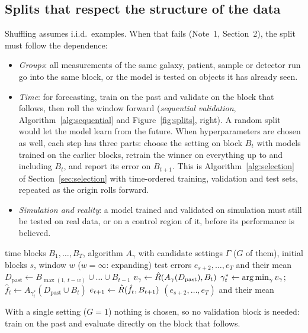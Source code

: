 \documentclass[11pt]{article}
\begin{document}
\subsection{Splits that respect the structure of the data}\label{sec:structure}

Shuffling assumes i.i.d.\ examples. When that fails (Note~1, Section~2), the split must follow the dependence:
\begin{itemize}
\item \emph{Groups}: all measurements of the same galaxy, patient, sample or detector run go into the same block, or
the model is tested on objects it has already seen.
\item \emph{Time}: for forecasting, train on the past and validate on the block that follows, then roll the window
forward (\emph{sequential validation}, Algorithm~\ref{alg:sequential} and Figure~\ref{fig:splits}, right). A random
split would let the model learn from the future. When hyperparameters are chosen as well, each step has three parts:
choose the setting on block $B_t$ with models trained on the earlier blocks, retrain the winner on everything up to
and including $B_t$, and report its error on $B_{t+1}$. This is Algorithm~\ref{alg:selection} of
Section~\ref{sec:selection} with time-ordered training, validation and test sets, repeated as the origin rolls
forward.
\item \emph{Simulation and reality}: a model trained and validated on simulation must still be tested on real data,
or on a control region of it, before its performance is believed.
\end{itemize}

\begin{algorithm}[htbp]\small
\caption{Sequential (rolling-origin) validation for time-ordered data}
\label{alg:sequential}
\begin{algorithmic}[1]
\Require time blocks $B_1, \dots, B_T$, algorithm $A_\gamma$ with candidate settings $\Gamma$ ($G$ of them), initial
blocks $s$, window $w$ ($w = \infty$: expanding)
\Ensure test errors $e_{s+2}, \dots, e_T$ and their mean
    \State $D_{\mathrm{past}} \gets B_{\max(1,\, t-w)} \cup \dots \cup B_{t-1}$ 
      \State $v_\gamma \gets \hat R(A_\gamma(D_{\mathrm{past}}), B_t)$ 
    \EndFor
    \State $\gamma_t^* \gets \operatorname*{arg\,min}_\gamma v_\gamma$; \ $\hat f_t \gets A_{\gamma_t^*}(D_{\mathrm{past}} \cup B_t)$ 
    \State $e_{t+1} \gets \hat R(\hat f_t, B_{t+1})$ 
  \EndFor
  \State \Return $(e_{s+2}, \dots, e_T)$ and their mean
\EndFunction
\end{algorithmic}
With a single setting ($G = 1$) nothing is chosen, so no validation block is needed: train on the past and evaluate
directly on the block that follows.
\end{algorithm}
\end{document}

